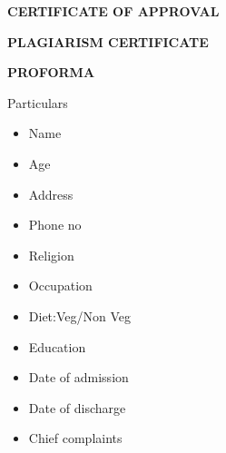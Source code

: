 \documentclass[14pt]{extarticle}
\begin{document}
\thispagestyle{empty}


\clearpage

\thispagestyle{empty}


\clearpage

\thispagestyle{empty}


\clearpage

\thispagestyle{empty}


\clearpage

\begin{center}
    \textbf{CERTIFICATE OF APPROVAL}
\end{center}

%
\clearpage

\textbf{PLAGIARISM CERTIFICATE}

\newpage

\textbf{PROFORMA}

Particulars

\begin{itemize}
    \item Name
    \item Age
    \item Address
    \item Phone no
    \item Religion
    \item Occupation
    \item Diet:Veg/Non Veg
    \item Education
    \item Date of admission
    \item Date of discharge
    \item Chief complaints
\end{itemize}
\end{document}
